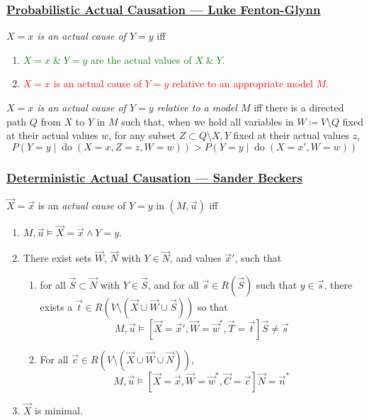 \documentclass[UTF8,11pt,colorlinks,compress,openany]{beamer}%
\begin{document}
\begin{frame}\frametitle{\href{https://framephys.files.wordpress.com/2020/02/probabilistic-actual-causation-ms.-luke-fento-glynn.pdf}{Probabilistic Actual Causation --- Luke Fenton-Glynn}}
\begin{definition}
\emph{$X=x$ is an actual cause of $Y=y$} iff
\begin{enumerate}
	\item \textcolor{green}{$X=x\; \&\; Y=y$ are the actual values of $X\; \&\; Y$.}
	\item \textcolor{red}{$X=x$ is an actual cause of $Y=y$ relative to an appropriate model $M$.}
\end{enumerate}
\end{definition}
\begin{definition}
\emph{$X=x$ is an actual cause of $Y=y$ relative to a model $M$} iff there is a directed path $Q$ from $X$ to $Y$ in $M$ such that, when we hold all variables in $W\coloneqq V\setminus Q$ fixed at their actual values $w$, for any subset $Z\subset Q\setminus X,Y$ fixed at their actual values $z$,
\[
P(Y = y\mid \operatorname{do}(X = x, Z = z, W = w)) > P(Y = y\mid \operatorname{do}(X = x',W = w))
\]
\end{definition}
\end{frame}

\begin{frame}\frametitle{\href{https://arxiv.org/abs/2102.02311}{Deterministic Actual Causation --- Sander Beckers}}
\begin{definition}
$\vec{X} = \vec{x}$ is an \emph{actual cause} of $Y=y$ in $(M,\vec{u})$ iff
\begin{enumerate}
\item $M,\vec{u} \vDash \vec{X} =\vec{x} \wedge Y=y$.
\item There exist sets $\vec{W}$, $\vec{N}$ with $Y \in \vec{N}$, and values $\vec{x}'$, such that
	\begin{enumerate}
	\item for all $\vec{S} \subset \vec{N}$ with $Y \in \vec{S}$, and for all $\vec{s} \in R(\vec{S})$ such that $y \in \vec{s}$, there exists a $\vec{t} \in R(V \setminus (\vec{X} \cup \vec{W} \cup \vec{S}))$ so that
	\[M,\vec{u}\vDash \left[\vec{X} = \vec{x}', \vec{W} = \vec{w}^*,\vec{T} = \vec{t}\right] \vec{S} \ne \vec{s}\]
	\item For all $\vec{c} \in R(V\setminus (\vec{X} \cup \vec{W} \cup \vec{N}))$,
	\[M,\vec{u}\vDash \left[\vec{X} = \vec{x}, \vec{W} = \vec{w}^*, \vec{C} = \vec{c}\right] \vec{N}=\vec{n}^*\]
	\end{enumerate}
\item $\vec{X}$ is minimal.
\end{enumerate}
\end{definition}
\end{frame}
\end{document}
